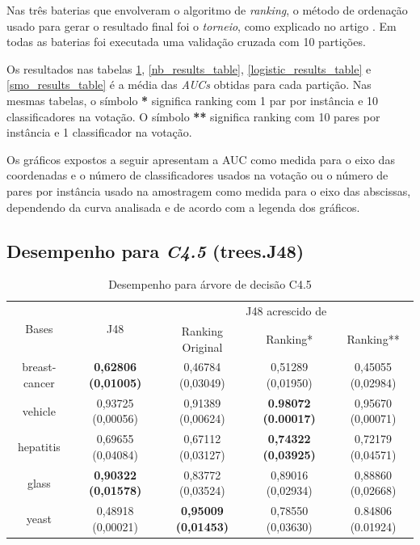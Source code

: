 Nas três baterias que envolveram o algoritmo de \emph{ranking}, o método de ordenação usado para gerar o resultado final foi o \emph{torneio}, como explicado no artigo \cite{langford08}. Em todas as baterias foi executada uma validação cruzada com 10 partições.

Os resultados nas tabelas \ref{j48_results_table}, \ref{nb_results_table}, \ref{logistic_results_table} e \ref{smo_results_table} é a média das \emph{AUCs} obtidas para cada partição. Nas mesmas tabelas, o símbolo \textbf{*} significa ranking com 1 par por instância e 10 classificadores na votação. O símbolo \textbf{**} significa ranking com 10 pares por instância e 1 classificador na votação.

Os gráficos expostos a seguir apresentam a AUC como medida para o eixo das coordenadas e o número de classificadores usados na votação ou o número de pares por instância usado na amostragem como medida para o eixo das abscissas, dependendo da curva analisada e de acordo com a legenda dos gráficos.

\clearpage
\pagebreak

\subsection{Desempenho para \emph{C4.5} (trees.J48)}


\begin{table}[h!]
    \begin{tabular}{ c c c c c }
        \hline
    
        \multirow{2}{*}{Bases} & \multirow{2}{*}{J48} & \multicolumn{3}{c}{J48 acrescido de} \\ \cline{3-5}
        & & {\small Ranking Original} & {\small Ranking*} & {\small  Ranking**} \\

        \hline
        
        breast-cancer & {\small \textbf{0,62806 (0,01005)}} & {\small 0,46784 (0,03049)} & {\small 0,51289 (0,01950)} & {\small 0,45055 (0,02984)} \\
        vehicle & {\small 0,93725 (0,00056)} & {\small 0,91389 (0,00624)} & {\small \textbf{0.98072 (0.00017)}} & {\small 0,95670 (0,00071)} \\
        hepatitis & {\small 0,69655 (0,04084)} & {\small 0,67112 (0,03127)} & {\small \textbf{0,74322 (0,03925)}} & {\small 0,72179 (0,04571)} \\
        glass & {\small \textbf{0,90322 (0,01578)}} & {\small 0,83772 (0,03524)} & {\small 0,89016 (0,02934)} & {\small 0,88860 (0,02668)} \\
        yeast & {\small 0,48918 (0,00021)} & {\small \textbf{0,95009 (0,01453)}} & {\small 0,78550 (0,03630)} & {\small 0.84806 (0.01924)} \\
    
        \hline
    \end{tabular}
    
    \caption{Desempenho para árvore de decisão C4.5}
    \label{j48_results_table}
\end{table}

